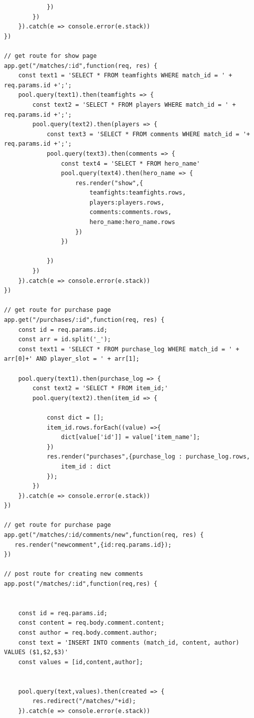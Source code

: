 \documentclass[a4paper]{article}
\begin{document}
\begin{lstlisting}
            })
        })
    }).catch(e => console.error(e.stack))
})

// get route for show page
app.get("/matches/:id",function(req, res) {
    const text1 = 'SELECT * FROM teamfights WHERE match_id = ' + req.params.id +';';
    pool.query(text1).then(teamfights => {
        const text2 = 'SELECT * FROM players WHERE match_id = ' + req.params.id +';';
        pool.query(text2).then(players => {
            const text3 = 'SELECT * FROM comments WHERE match_id = '+ req.params.id +';';
            pool.query(text3).then(comments => {
                const text4 = 'SELECT * FROM hero_name'
                pool.query(text4).then(hero_name => {
                    res.render("show",{
                        teamfights:teamfights.rows,
                        players:players.rows,
                        comments:comments.rows,
                        hero_name:hero_name.rows
                    })                    
                })

            })
        })
    }).catch(e => console.error(e.stack))
})

// get route for purchase page
app.get("/purchases/:id",function(req, res) {
    const id = req.params.id;
    const arr = id.split('_');
    const text1 = 'SELECT * FROM purchase_log WHERE match_id = ' + arr[0]+' AND player_slot = ' + arr[1];
    
    pool.query(text1).then(purchase_log => {
        const text2 = 'SELECT * FROM item_id;'
        pool.query(text2).then(item_id => {

            const dict = [];
            item_id.rows.forEach((value) =>{
                dict[value['id']] = value['item_name'];
            })
            res.render("purchases",{purchase_log : purchase_log.rows,
                item_id : dict
            });
        })
    }).catch(e => console.error(e.stack))
})

// get route for purchase page
app.get("/matches/:id/comments/new",function(req, res) {
   res.render("newcomment",{id:req.params.id});
})

// post route for creating new comments
app.post("/matches/:id",function(req,res) {

    
    const id = req.params.id;
    const content = req.body.comment.content;
    const author = req.body.comment.author;
    const text = 'INSERT INTO comments (match_id, content, author) VALUES ($1,$2,$3)'
    const values = [id,content,author];
    
    
    pool.query(text,values).then(created => {
        res.redirect("/matches/"+id);
    }).catch(e => console.error(e.stack))


\end{lstlisting}
\end{document}
